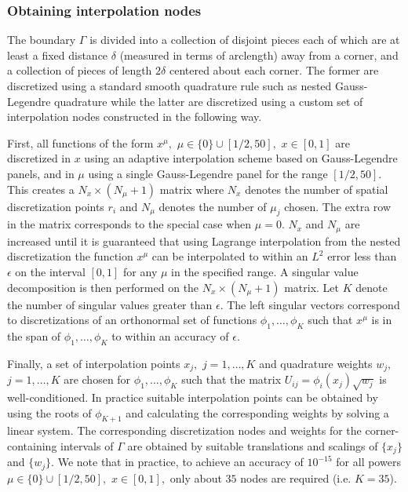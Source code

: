 
\subsubsection{Obtaining interpolation nodes}

The boundary {\color{olive}$\Gamma$ is divided into a collection of disjoint pieces each of which are at least a fixed distance $\delta$  (measured in terms of arclength) away from a corner, and a collection of pieces of length $2 \delta$ centered about each corner. }The former are discretized using a standard smooth quadrature rule such as {\color{red}nested} Gauss-Legendre quadrature while the latter are discretized using a custom set of interpolation nodes constructed in the following way.

First, all functions of the form $x^\mu,$ $\mu \in \{0\} \cup [1/2,50],$ $x \in [0,1]$ are discretized {\color{olive} in $x$ using an adaptive interpolation scheme based on Gauss-Legendre panels}, and {\color{olive}in $\mu$ using} a single Gauss-Legendre panel for the range $[1/2,50].$ This creates a $N_x \times (N_\mu+1)$ matrix where $N_x$ denotes the number of spatial discretization points $r_i$ and $N_\mu$ denotes the number of $\mu_j$ chosen. The extra row in the matrix corresponds to the special case when $\mu = 0.$ $N_x$ and $N_\mu$ are increased until it is guaranteed that using Lagrange interpolation from the nested discretization the function $x^\mu$ can be interpolated to within an $L^2$ error less than $\epsilon$ on the interval $[0,1]$ for any $\mu$ in the specified range. A singular value decomposition is then performed on the $N_x \times (N_\mu+1)$ matrix. Let $K$ denote the number of singular values greater than $\epsilon.$ The left singular vectors correspond to discretizations of an orthonormal set of functions $\phi_1,\dots,\phi_K$ such that $x^\mu$ is in the span of $\phi_1,\dots,\phi_K$ to within an accuracy of $\epsilon.$

Finally, a set of interpolation points $x_j,$ $j=1,\dots,K$ and quadrature weights $w_j,$ $j=1,\dots,K$ are chosen for $\phi_1,\dots,\phi_K$ such that the matrix $U_{ij} = \phi_i(x_j) \sqrt{w_j}$ is well-conditioned. In practice suitable interpolation points can be obtained by using the roots of $\phi_{K+1}$ and calculating the corresponding weights by solving a linear system. The corresponding discretization nodes and weights for the corner-containing intervals of $\Gamma$ are obtained by suitable translations and scalings of $\{x_j\}$ and $\{w_j\}.$ {\color{olive}We note that in practice, to achieve an accuracy of $10^{-15}$ for all powers $\mu \in \{0\} \cup [1/2,50],$ $x \in [0,1],$ only about $35$ nodes are required (i.e. $K = 35$).}

